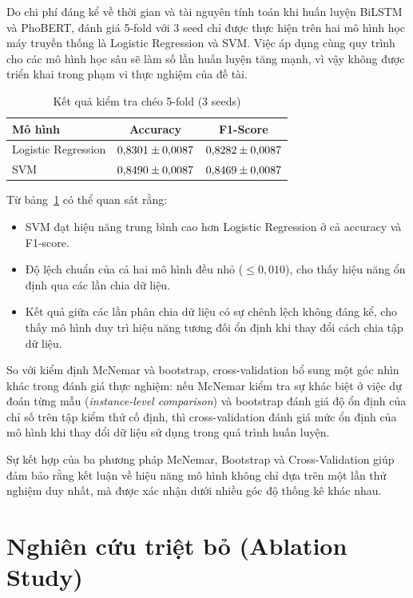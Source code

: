 Do chi phí đáng kể về thời gian và tài nguyên tính toán khi huấn luyện BiLSTM và PhoBERT, đánh giá 5-fold với 3 seed chỉ được thực hiện trên hai mô hình học máy truyền thống là Logistic Regression và SVM. Việc áp dụng cùng quy trình cho các mô hình học sâu sẽ làm số lần huấn luyện tăng mạnh, vì vậy không được triển khai trong phạm vi thực nghiệm của đề tài.
\begin{table}[H]
\centering
\caption{Kết quả kiểm tra chéo 5-fold (3 seeds)}
\label{tab:cv}
\begin{tabular}{lcc}
\toprule
Mô hình & Accuracy & F1-Score \\
\midrule
Logistic Regression & $0{,}8301 \pm 0{,}0087$ & $0{,}8282 \pm 0{,}0087$ \\
SVM                 & $0{,}8490 \pm 0{,}0087$ & $0{,}8469 \pm 0{,}0087$ \\
\bottomrule
\end{tabular}
\end{table}

Từ bảng~\ref{tab:cv} có thể quan sát rằng:

\begin{itemize}
    \item SVM đạt hiệu năng trung bình cao hơn Logistic Regression ở cả accuracy và F1-score.
    \item Độ lệch chuẩn của cả hai mô hình đều nhỏ ($\leq 0{,}010$), cho thấy hiệu năng ổn định qua các lần chia dữ liệu.
    \item Kết quả giữa các lần phân chia dữ liệu có sự chênh lệch không đáng kể, cho thấy mô hình duy trì hiệu năng tương đối ổn định khi thay đổi cách chia tập dữ liệu.
\end{itemize}

So với kiểm định McNemar và bootstrap, cross-validation bổ sung một góc nhìn khác trong đánh giá thực nghiệm: nếu McNemar kiểm tra sự khác biệt ở việc dự đoán từng mẫu (\textit{instance-level comparison}) và bootstrap đánh giá độ ổn định của chỉ số trên tập kiểm thử cố định, thì cross-validation đánh giá mức ổn định của mô hình khi thay đổi dữ liệu sử dụng trong quá trình huấn luyện.

Sự kết hợp của ba phương pháp McNemar, Bootstrap và Cross-Validation giúp đảm bảo rằng kết luận về hiệu năng mô hình không chỉ dựa trên một lần thử nghiệm duy nhất, mà được xác nhận dưới nhiều góc độ thống kê khác nhau.

\section{Nghiên cứu triệt bỏ (Ablation Study)}
\label{sec:ablation}

